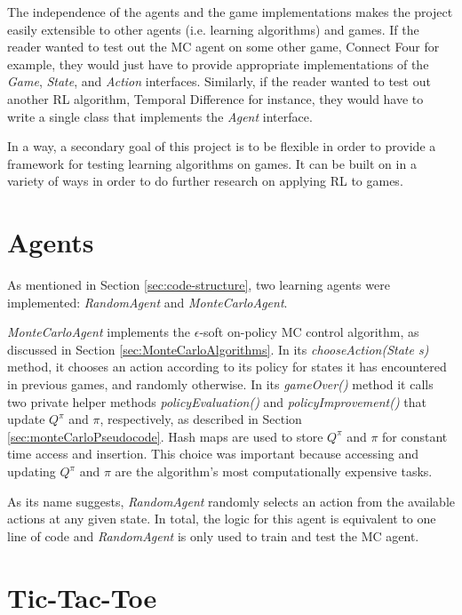 \documentclass[11pt,a4paper]{report}
\begin{document}
The independence of the agents and the game implementations makes the project easily extensible to other agents (i.e. learning algorithms) and games. If the reader wanted to test out the MC agent on some other game, Connect Four for example, they would just have to provide appropriate implementations of the \emph{Game}, \emph{State}, and \emph{Action} interfaces. Similarly, if the reader wanted to test out another RL algorithm, Temporal Difference for instance, they would have to  write a single class that implements the \emph{Agent} interface.

In a way, a secondary goal of this project is to be flexible in order to provide a framework for testing learning algorithms on games. It can be built on in a variety of ways in order to do further research on applying RL to games.


\section{Agents}
\label{sec:Agents}

As mentioned in Section \ref{sec:code-structure}, two learning agents were implemented: \emph{RandomAgent} and \emph{MonteCarloAgent}.

\emph{MonteCarloAgent} implements the $\epsilon$-soft on-policy MC control algorithm, as discussed in Section \ref{sec:MonteCarloAlgorithms}. In its \emph{chooseAction(State s)} method, it chooses an action according to its policy for states it has encountered in previous games, and randomly otherwise. In its \emph{gameOver()} method it calls two private helper methods \emph{policyEvaluation()} and \emph{policyImprovement()} that update $Q^{\pi}$ and $\pi$, respectively, as described in Section \ref{sec:monteCarloPseudocode}. Hash maps are used to store $Q^{\pi}$ and $\pi$ for constant time access and insertion. This choice was important because accessing and updating $Q^{\pi}$ and $\pi$ are the algorithm's most computationally expensive tasks.

As its name suggests, \emph{RandomAgent} randomly selects an action from the available actions at any given state. In total, the logic for this agent is equivalent to one line of code and \emph{RandomAgent} is only used to train and test the MC agent.


\newpage

\section{Tic-Tac-Toe}
\label{sec:TicTacToe}
\end{document}
